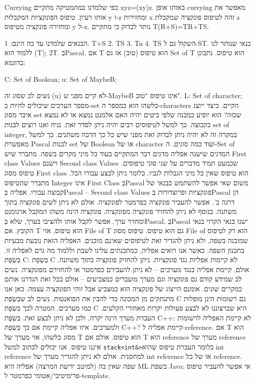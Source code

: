 \begin{טבלא}[!htbp]
      Currying
      כפי שלמדנו במתמטיקה מתקיים xyz=(xy)z. באותו אופן currying מאפשר את אותו רעיון. טיפוס הפונקציות המקבלות y ו-z ומחזירות x זהה לטיפוס פונקציה שמקבלת z ומחזירה פונקציה מטיפוס y ל-x.
      נותר לבדוק כי מתקיים T(R+S)=TR+TS.

      הבנאים שלמדנו עד כה הינם:
      1. T+S
      2. TS
      3. Tn
      4. TS השקול גם ל-ST.
      בנאי שנותר לנו ללמוד הוא (T); 2T.
      בְּPascal, אם T הוא טיפוס (טוב) אז גם Set of T הוא טיפוס.
      נתבונן בדוגמא:

      C: Set of Boolean;
      u: Set of MaybeB;

      נשים לב שסוג זה (u) לא קיים מפני ש-MaybeB אינו טיפוס "טוב".
      L: Set of character;
      מספר הערכים שיכולים להיות ב-set כלשהו הוא כמספר ה-characters הקיים.
      כיצד ייוצג איבר מסוג set שכזה? הוא יופיע כמבנה שלפי ביטים יהיה האם אלמנט נמצא או לא נמצא בקבוצה.
      כך למשל לטיפוסים רבים יהיה ניתן לסדר זאת.
      נניח ואנו רוצים לבנות set of integer, במקרה זה לא יהיה ניתן לבדוק זאת מפני שיש כל כך הרבה משתנים.
      כך למשל מאפשרת Pascal לבנות set של Boolean או של character ועוד כמה סוגים.
      ה-Set of המדגים שישנה אפליה מדגים דבר המתקיים בעוד כל מיני מקרים בשפה.
      מתברר שיש First class Values וישנם Second class Values שכמעט תמיד מדברים על שני סוגי טיפוסים.
      טיפוס מסוג First class הוא טיפוס שאין כל מיני הגבלות לגביו. כלומר ניתן לבצע עבורו הכל.
      מתברר שהטיפוס Integer אינו First Class בְּPascal משום שאי אפשר להשתמש בבנאי של קבוצה עבורו.
      אפליה בְּPascal – Second class Values פונקציות ופרוצדורות בְּPascal הן דרגה ב'. אפשר להעביר פונקציה כפרמטר לפונקציה. אולם לא ניתן לשים פונקציה בתוך משתנה. בנוסף לא ניתן להחזיר פונקציה מפונקציה.
      פונקציה הינה משהו המקבל ארגומנט ומחזיר ערך. אפשר לקבל אותו ולהציבו בערך, שלא בְּPascal.
      בְּPascal ישנו בנאי הקרוי בנאי הקובץ. אם T הוא טיפוס, אזי File of T גם הוא טיפוס. טיפוס מסוג File of הוא רק לטיפוס שמובנה בשפה, ולא ניתן להגדיר זאת לטיפוסים שאינם מובנים. האפליה הזאת נובעת מבעיות בתכנון השפה.
      כאשר אנו רואים אפליה, כמתכנתים עלינו לשבת וללמוד מה גרם לאפליה זו.
      בִּשְׂפַת C:
      בִּשְׂפַת C לא קיימות אפליות נגד פונקציות. ניתן להחזיק פונקציה בתוך משתנה.
      אולם, קיימת אפליה כנגד מערכים – לא ניתן להעבירם כפרמטר או להחזירם מפונקציה.
      נשים לב שמידע קודם גם פונקציה וגם מערך מועברים כמצביעים – אולם בכל זאת הגדרנו אותם כמקרים שונים. אומנם הייצוג של פונקציה הוא כמצביע אבל זוהי הפונקציה עצמה. כאן אנו מתנתקים מן המכונה כדי להבין את הפואנטות.
      נשים לב שבִּשְׂפַת C גם רשומות הינן מופלות כמו מערכים.
      המטרה לכך בִּשְׂפַת C היא שברצוננו לא לבצע פעולות יקרות מאחורי הקלעים. העברת מערך הינה יקרה, ולכן לא ניתן לבצע זאת.
      בִּשְׂפַת C++:
      לא קיימת האפליה לרשומות ולמערכים. איזו אפליה קיימת אם כך בִּשְׂפַת C++? קיימת אפליה ל-reference.
      אם T הוא מסוג כלשהו, אזי מערך של T הוא טיפוס. אולם אם T הוא reference מערך של reference איננו טיפוס.
      אנו יכולים לכתוב למשל \verb+stack<int&>+כלומר העברת טיפוס שהוא int reference למחסנית. אולם לא ניתן להגדיר מערך של int reference או של כל reference.
      שפה שאין בה (למיטב ידיעת המרצה) אפליה היא ML
      בשפת Java:
      אי אפשר להעביר טיפוס פרימיטיבי/אטומי כפרמטר ל-template.


\end{טבלא}
